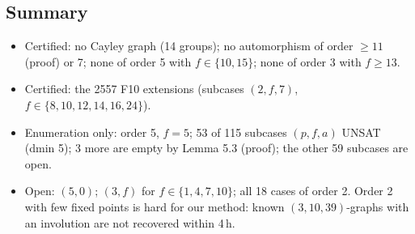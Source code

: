 \subsection{Summary}\label{sec:sym-summary}
\begin{itemize}
\item Certified: no Cayley graph (14 groups); no automorphism of order $\ge 11$ (proof) or 7; none of
  order 5 with $f \in \{10,15\}$; none of order 3 with $f \ge 13$.
\item Certified: the 2557 F10 extensions (subcases $(2, f, 7)$, $f \in \{8,10,12,14,16,24\}$).
\item Enumeration only: order 5, $f = 5$; 53 of 115 subcases
  $(p, f, a)$ UNSAT (dmin 5); 3 more are empty by Lemma 5.3 (proof); the other 59 subcases are open.
\item Open: $(5,0)$; $(3, f)$ for $f \in \{1,4,7,10\}$; all 18 cases of order 2. Order 2 with few fixed points is
  hard for our method: known $(3,10,39)$-graphs with an involution are not recovered within 4\,h.
\end{itemize}
